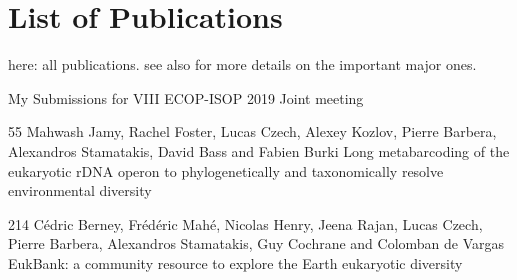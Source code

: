 
\cleardoublepage

\chapter{List of Publications}
\label{ch:Publications}

here: all publications.
see also  for more details on the important major ones.




My Submissions for VIII ECOP-ISOP 2019 Joint meeting

55	Mahwash Jamy, Rachel Foster, Lucas Czech, Alexey Kozlov, Pierre Barbera, Alexandros Stamatakis, David Bass and Fabien Burki	Long metabarcoding of the eukaryotic rDNA operon to phylogenetically and taxonomically resolve environmental diversity

214	Cédric Berney, Frédéric Mahé, Nicolas Henry, Jeena Rajan, Lucas Czech, Pierre Barbera, Alexandros Stamatakis, Guy Cochrane and Colomban de Vargas	EukBank: a community resource to explore the Earth eukaryotic diversity

